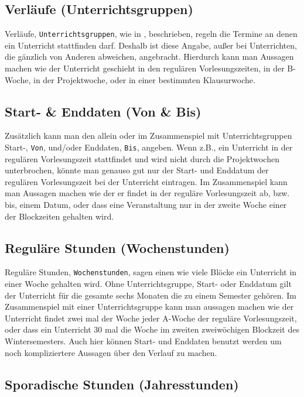 \subsection{Verläufe (Unterrichtsgruppen)}

Verläufe, \texttt{Unterrichtsgruppen}, wie in , beschrieben, regeln die Termine an denen ein Unterricht stattfinden darf. Deshalb ist diese Angabe, außer bei Unterrichten, die gänzlich von Anderen abweichen, angebracht. Hierdurch kann man Aussagen machen wie der Unterricht geschieht in den regulären Vorlesungszeiten, in der B-Woche, in der Projektwoche, oder in einer bestimmten Klausurwoche.

\subsection{Start- \& Enddaten (Von  \& Bis)}

Zusätzlich kann man den allein oder im Zusammenspiel mit Unterrichtsgruppen Start-, \texttt{Von}, und/oder Enddaten, \texttt{Bis}, angeben. Wenn z.B., ein Unterricht in der regulären Vorlesungszeit stattfindet und wird nicht durch die Projektwochen unterbrochen, könnte man genauso gut nur der Start- und Enddatum der regulären Vorlesungszeit bei der Unterricht eintragen. Im Zusammenspiel kann man Aussagen machen wie der er findet in der reguläre Vorlesungszeit ab, bzw. bis, einem Datum, oder dass eine Veranstaltung nur in der zweite Woche einer der Blockzeiten gehalten wird.

\subsection{Reguläre Stunden (Wochenstunden)}

Reguläre Stunden, \texttt{Wochenstunden}, sagen einen wie viele Blöcke ein Unterricht in einer Woche gehalten wird. Ohne Unterrichtsgruppe, Start- oder Enddatum gilt der Unterricht für die gesamte sechs Monaten die zu einem Semester gehören. Im Zusammenspiel mit einer Unterrichtsgruppe kann man aussagen machen wie der Unterricht findet zwei mal der Woche jeder A-Woche der reguläre Vorlesungszeit, oder dass ein Unterricht 30 mal die Woche im zweiten zweiwöchigen Blockzeit des Wintersemesters. Auch hier können Start- und Enddaten benutzt werden um noch kompliziertere Aussagen über den Verlauf zu machen.

\subsection{Sporadische Stunden (Jahresstunden)}

